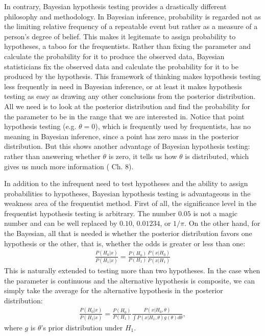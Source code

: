 \documentclass[12pt]{article} \usepackage[nolists]{endfloat}
\begin{document}
In contrary, Bayesian hypothesis testing provides a drastically
different philosophy and methodology.  In Bayesian inference,
probability is regarded not as the limiting relative frequency of a
repeatable event but rather as a measure of a person's degree of
belief.  This makes it legitemate to assign probability to hypotheses,
a taboo for the frequentists.  Rather than fixing the parameter and
calculate the probability for it to produce the observed data,
Bayesian statisticians fix the observed data and calculate the
probability for it to be produced by the hypothesis.  This framework
of thinking makes hypothesis testing less frequently in need in
Bayesian inference, or at least it makes hypothesis testing as easy as
drawing any other conclusions from the posterior distribution.  All we need is to look at the posterior
distribution and find the probability for the parameter to be in the
range that we are interested in.  Notice that point hypothesis testing
(e.g. $\theta = 0$), which is frequently used by frequentists, has no
meaning in Bayesian inference, since a point has zero mass in the
posterior distribution.  But this shows another advantage of Bayesian
hypothesis testing: rather than answering whether $\theta$ is zero, it
tells us how $\theta$ is distributed, which gives us much more
information (\cite{gelman} Ch. 8).

In addition to the infrequent need to test hypotheses and the ability
to assign probabilities to hypotheses, Bayesian hypothesis testing is
advantageous in the weakness area of the frequentist method.  First of
all, the significance level in the frequentist hypothesis testing is
arbitrary. The number $0.05$ is not a magic number and can be well replaced
by $0.10$, $0.01234$, or $1/\pi$.  On the other hand, for the
Bayesian, all that is needed is whether the posterior distribution
favors one hypothesis or the other, that is, whether the odds is
greater or less than one:
\begin{align*}
  \frac{P(H_0 | x)}{P(H_1 | x)} = \frac{P(H_0)}{P(H_1)} \frac{P(x | H_0)}{P(x | H_1)}
\end{align*}
This is naturally extended to testing more than two hypotheses.  In
the case when the parameter is continuous and the alternative
hypothesis is composite, we can simply take the average for the
alternative hypothesis in the posterior distribution:
\begin{align*}
  \frac{P(H_0 | x)}{P(H_1 | x)} = \frac{P(H_0)}{P(H_1)} \frac{P(x | H_0, \theta)}{\int P(x | H_1, \theta) g(\theta) d\theta},
\end{align*}
where $g$ is $\theta$'s prior distribution under $H_1$.
  
\end{document}
